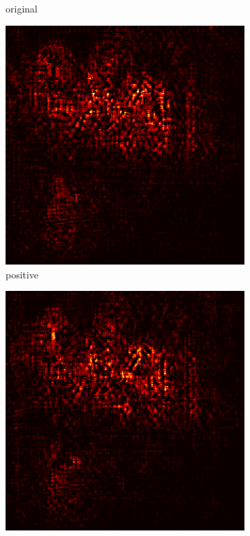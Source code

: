 \documentclass[preprint,12pt]{elsarticle}
\begin{document}
\begin{figure}
\begin{subfigure}{0.14\linewidth}
        \caption{original}
    \end{subfigure}
    \hfill
    \begin{subfigure}{0.14\textwidth}
        \centering
        \includegraphics[width=\linewidth]{../visualizations/examples/imagenette/resnet18/positive_saliency_map/5.png}
        \caption{positive}
    \end{subfigure}
    \hfill
    \begin{subfigure}{0.14\textwidth}
        \centering
        \includegraphics[width=\linewidth]{../visualizations/examples/imagenette/resnet18/negative_saliency_map/5.png}

\end{subfigure}
\end{figure}
\end{document}
